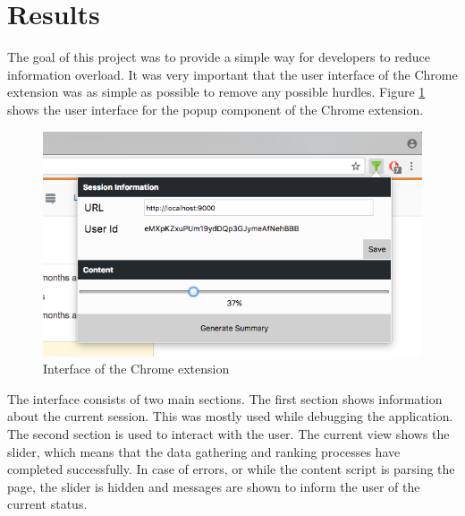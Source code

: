 \section{Results}\label{sec:results}
The goal of this project was to provide a simple way for developers to reduce information overload. It was very important that the user interface of the Chrome extension was as simple as possible to remove any possible hurdles. Figure \ref{fig:chromeExtensionInterfaceScreenshot} shows the user interface for the popup component of the Chrome extension. 

\begin{figure}[H]
\centering
\includegraphics{Figures/ChromeUI}
\caption{Interface of the Chrome extension}
\label{fig:chromeExtensionInterfaceScreenshot}
\end{figure}

The interface consists of two main sections. The first section shows information about the current session. This was mostly used while debugging the application. The second section is used to interact with the user. The current view shows the slider, which means that the data gathering and ranking processes have completed successfully. In case of errors, or while the content script is parsing the page, the slider is hidden and messages are shown to inform the user of the current status. 

